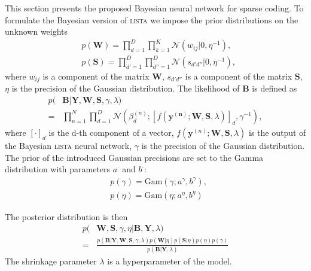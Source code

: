 \documentclass[letterpaper]{article}
\begin{document}
This section presents the proposed Bayesian neural network for sparse coding. To formulate the Bayesian version of \textsc{lista} we impose the prior distributions on the unknown weights
\begin{subequations}
\label{eq:ws}
\begin{align}
&p(\mathbf{W}) = \prod_{d=1}^D\prod_{k=1}^K \mathcal{N}(w_{ij} | 0, \eta^{-1}), \\
&p(\mathbf{S}) = \prod_{d'=1}^D\prod_{d''=1}^D \mathcal{N}(s_{d'd''} | 0, \eta^{-1}),
\end{align}
\end{subequations}
where $w_{ij}$ is a component of the matrix $\mathbf{W}$, $s_{d'd''}$ is a component of the matrix $\mathbf{S}$, $\eta$ is the precision of the Gaussian distribution.
The likelihood of $\mathbf{B}$ is defined as 
\begin{align}
p(&\mathbf{B}| \mathbf{Y}, \mathbf{W}, \mathbf{S}, \gamma, \lambda) \nonumber \\
\label{eq:likelihood}
= &\prod_{n=1}^N\prod_{d=1}^D\mathcal{N}(\beta_d^{(n)}; [f(\mathbf{y^{(n)}}; \mathbf{W}, \mathbf{S}, \lambda)]_d, \gamma^{-1}),
\end{align}
where $[\cdot]_d$ is the d-th component of a vector, $f(\mathbf{y}^{(n)}; \mathbf{W}, \mathbf{S}, \lambda)$ is the output of the Bayesian \textsc{lista} neural network, $\gamma$ is the precision of the Gaussian distribution.
The prior of the introduced Gaussian precisions are set to the Gamma distribution with parameters $a^{\cdot}$ and $b^{\cdot}$:
\begin{subequations}
\label{eq:gamma_eta}
\begin{align}
&p(\gamma) = \text{Gam}\left(\gamma; a^{\gamma}, b^{\gamma}\right), \\
&p(\eta) = \text{Gam}\left(\eta; 	a^{\eta}, b^{\eta}\right)
\end{align}
\end{subequations}

The posterior distribution is then
\begin{align}
p(&\mathbf{W}, \mathbf{S}, \gamma, \eta | \mathbf{B}, \mathbf{Y}, \lambda) \nonumber \\
\label{eq:posterior}
= & \frac{p(\mathbf{B} | \mathbf{Y}, \mathbf{W},  \mathbf{S}, \gamma, \lambda) p(\mathbf{W} | \eta )p(\mathbf{S} | \eta) p(\eta) p(\gamma)}{p(\mathbf{B} | \mathbf{Y}, \lambda)}
\end{align}
The shrinkage parameter $\lambda$ is a hyperparameter of the model.
\end{document}

